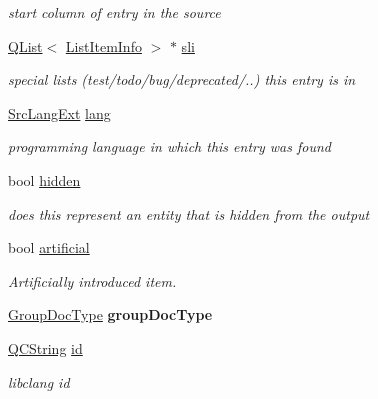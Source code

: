 \begin{DoxyCompactItemize}
\begin{DoxyCompactList}\small\item\em start column of entry in the source \end{DoxyCompactList}\item 
\hypertarget{class_entry_ab7e21392b0b15c2488254deb7a88ae43}{\hyperlink{class_q_list}{Q\-List}$<$ \hyperlink{struct_list_item_info}{List\-Item\-Info} $>$ $\ast$ \hyperlink{class_entry_ab7e21392b0b15c2488254deb7a88ae43}{sli}}\label{class_entry_ab7e21392b0b15c2488254deb7a88ae43}

\begin{DoxyCompactList}\small\item\em special lists (test/todo/bug/deprecated/..) this entry is in \end{DoxyCompactList}\item 
\hypertarget{class_entry_a8fb5884a6d7ef3c2caf306ee89a7f79e}{\hyperlink{types_8h_a9974623ce72fc23df5d64426b9178bf2}{Src\-Lang\-Ext} \hyperlink{class_entry_a8fb5884a6d7ef3c2caf306ee89a7f79e}{lang}}\label{class_entry_a8fb5884a6d7ef3c2caf306ee89a7f79e}

\begin{DoxyCompactList}\small\item\em programming language in which this entry was found \end{DoxyCompactList}\item 
\hypertarget{class_entry_a4aefc4965852492e2f02de00f05e6698}{bool \hyperlink{class_entry_a4aefc4965852492e2f02de00f05e6698}{hidden}}\label{class_entry_a4aefc4965852492e2f02de00f05e6698}

\begin{DoxyCompactList}\small\item\em does this represent an entity that is hidden from the output \end{DoxyCompactList}\item 
\hypertarget{class_entry_a222a9730f2a9e6da0081d74932318d87}{bool \hyperlink{class_entry_a222a9730f2a9e6da0081d74932318d87}{artificial}}\label{class_entry_a222a9730f2a9e6da0081d74932318d87}

\begin{DoxyCompactList}\small\item\em Artificially introduced item. \end{DoxyCompactList}\item 
\hypertarget{class_entry_a02055a6eda1a64400d38b3ed37ba9328}{\hyperlink{class_entry_ac51ac416856cada4f7237ba7da7f3938}{Group\-Doc\-Type} {\bfseries group\-Doc\-Type}}\label{class_entry_a02055a6eda1a64400d38b3ed37ba9328}

\item 
\hypertarget{class_entry_ac4d9c74c3dc66b375a8567a153a09fc2}{\hyperlink{class_q_c_string}{Q\-C\-String} \hyperlink{class_entry_ac4d9c74c3dc66b375a8567a153a09fc2}{id}}\label{class_entry_ac4d9c74c3dc66b375a8567a153a09fc2}

\begin{DoxyCompactList}\small\item\em libclang id \end{DoxyCompactList}\end{DoxyCompactItemize}
